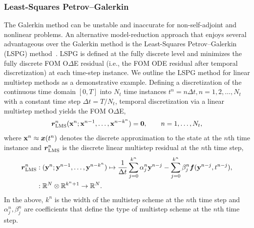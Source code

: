 \documentclass[3p,computermodern,10pt]{elsarticle}
\begin{document}
\subsubsection{Least-Squares Petrov--Galerkin}
The Galerkin method can be unstable and inaccurate for non-self-adjoint and nonlinear problems. 
An alternative model-reduction approach that enjoys several advantageous over the Galerkin method is the Least-Squares Petrov--Galerkin (LSPG) method~\cite{carlberg_lspg_v_galerkin,carlberg_thesis,carlberg_gnat,bui_unsteady,bui_thesis}. LSPG is defined at the fully discrete level and minimizes the fully discrete FOM O$\Delta$E residual (i.e., the FOM ODE residual after temporal discretization) at each time-step instance.  We outline the LSPG method for linear multistep methods as a demonstrative example. Defining a discretization of the continuous time domain $[0,T]$ into $N_t$ time instances $t^n = n\Delta t, n=1,2,\ldots,N_t$ with a constant time step $\Delta t = T/N_t$, temporal discretization via a linear multistep method yields the FOM O$\Delta$E,
\begin{equation}\label{eq:lms}
\boldsymbol r_{\text{LMS}}^{n} ({\mathbf{x}}^{n};{\mathbf{x}}^{n-1},\ldots,{\mathbf{x}}^{n-k^n}) = \boldsymbol 0, \qquad n=1,\ldots,N_t, 
\end{equation}
where ${\mathbf{x}}^{n} \approx {\boldsymbol x}(t^n)$ denotes the discrete approximation to the state at the $n${th} time instance and 
$\boldsymbol r_{\text{LMS}}^{n}$ is the discrete linear multistep residual at the $n$th time step,
\begin{align*}
\boldsymbol r_{\text{LMS}}^{n} &: (\mathbf{y}^{n};\mathbf{y}^{n-1},\ldots,\mathbf{y}^{n-k^n}) \mapsto  \frac{1}{\Delta t} \sum_{j=0}^{k^n} \alpha^n_j \mathbf{y}^{n-j} -  \sum_{j=0}^{k^n} \beta^n_j \boldsymbol f(\mathbf{y}^{n-j},t^{n-j}),
\\
&: \mathbb{R}^{N} \otimes \mathbb{R}^{k^n + 1} \rightarrow \mathbb{R}^{N}. 
\end{align*} 
In the above, $k^n$ is the width of the multistep scheme at the $n$th time step and $\alpha^n_j,\beta^n_j$ are coefficients that define the type of multistep scheme at the $n$th time step.
\end{document}
